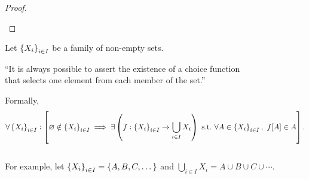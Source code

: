 \documentclass[11pt,openany]{article}
\begin{document}
\begin{proof}
\begin{enumerate}[(1)]
\end{enumerate}
\end{proof}

\newpage
\begin{note}
	Let $\set{X_i}_{i\in I}$ be a family of non-empty sets. \begin{center}
		``It is always possible to assert the existence of a choice function\\ that selects one element from each member of the set.''
	\end{center} Formally, \[
	\forall\set{X_i}_{i\in I}:\left[\varnothing\notin \set{X_i}_{i\in I}\implies\exists\left(f:\set{X_i}_{i\in I}\to\bigcup_{i\in I} X_i\right)\ \text{s.t.}\ \forall A\in\set{X_i}_{i\in I},\ f[A]\in A\right].
	\] 
	\vspace{24pt} \\
	\noindent For example, let $\set{X_i}_{i\in I}=\set{A,B,C,\dots}$ and $\bigcup_{i\in I}X_i=A\cup B\cup C\cup\cdots$.
	\begin{figure}[h!]\centering
		
	\end{figure}
\end{note}
%	
\end{document}
